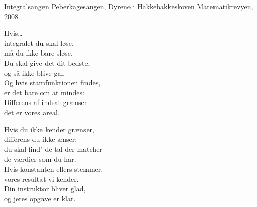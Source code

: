\begin{song}{Integralsangen}
  {} %
  {Peberkagesangen, Dyrene i Hakkebakkeskoven} %
  {} %
  {Matematikrevyen, 2008} %
  {\NotCCLIed} %

  \begin{SBVerse}
		Hvis\ldots\\
		integralet du skal løse,\\
		må du ikke bare sløse.\\
		Du skal give det dit bedste,\\
		og så ikke blive gal.\\
		Og hvis stamfunktionen findes,\\
		er det bare om at mindes:\\
		Differens af indsat grænser\\
		det er vores areal.
  \end{SBVerse}

  \begin{SBVerse}
		Hvis du ikke kender grænser,\\
		differens du ikke ænser;\\
		du skal find’ de tal der matcher\\
		de værdier som du har.\\
		Hvis konstanten ellers stemmer,\\
		vores resultat vi kender.\\
		Din instruktor bliver glad,\\
		og jeres opgave er klar.
  \end{SBVerse}
\end{song}